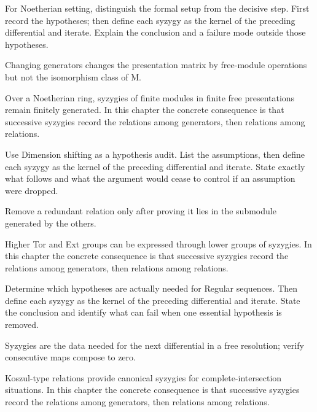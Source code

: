 \begin{exercise}\label{exr:v24-05}
For Noetherian setting, distinguish the formal setup from the decisive step. First record the hypotheses; then define each syzygy as the kernel of the preceding differential and iterate. Explain the conclusion and a failure mode outside those hypotheses.
\end{exercise}
\begin{hint}
Changing generators changes the presentation matrix by free-module operations but not the isomorphism class of M.
\end{hint}
\begin{solution}
Over a Noetherian ring, syzygies of finite modules in finite free presentations remain finitely generated. In this chapter the concrete consequence is that successive syzygies record the relations among generators, then relations among relations.
\end{solution}

\begin{exercise}\label{exr:v24-06}
Use Dimension shifting as a hypothesis audit. List the assumptions, then define each syzygy as the kernel of the preceding differential and iterate. State exactly what follows and what the argument would cease to control if an assumption were dropped.
\end{exercise}
\begin{hint}
Remove a redundant relation only after proving it lies in the submodule generated by the others.
\end{hint}
\begin{solution}
Higher Tor and Ext groups can be expressed through lower groups of syzygies. In this chapter the concrete consequence is that successive syzygies record the relations among generators, then relations among relations.
\end{solution}

\begin{exercise}\label{exr:v24-07}
Determine which hypotheses are actually needed for Regular sequences. Then define each syzygy as the kernel of the preceding differential and iterate. State the conclusion and identify what can fail when one essential hypothesis is removed.
\end{exercise}
\begin{hint}
Syzygies are the data needed for the next differential in a free resolution; verify consecutive maps compose to zero.
\end{hint}
\begin{solution}
Koszul-type relations provide canonical syzygies for complete-intersection situations. In this chapter the concrete consequence is that successive syzygies record the relations among generators, then relations among relations.
\end{solution}

